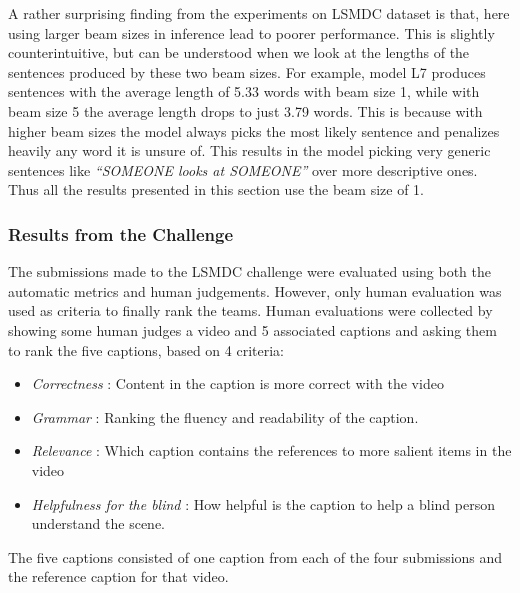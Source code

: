 A rather surprising finding from the experiments on LSMDC dataset is that, here
using larger beam sizes in inference lead to poorer performance.
This is slightly counterintuitive, but can be understood when we look at the
lengths of the sentences produced by these two beam sizes. 
For example, model L7 produces sentences with the average length
of 5.33 words with beam size 1, while with beam size 5 the average length drops
to just 3.79 words. This is because with higher beam sizes the model always
picks the most likely sentence and penalizes heavily any word it is unsure of.
This results in the model picking very generic sentences like \emph{``SOMEONE
looks at SOMEONE''} over more descriptive ones.
Thus all the results presented in this section use the beam size of 1.

\subsubsection{Results from the Challenge}
\label{subsec:LSMDCChall}
The submissions made to the LSMDC challenge were evaluated using both the
automatic metrics and human judgements.
However, only human evaluation was used as criteria to finally rank the teams.
Human evaluations were collected by showing some human judges a video and 5
associated captions and asking them to rank the five captions, based on 4
criteria:
\begin{itemize}
  \item \emph{Correctness} : Content in the caption is more correct with the video 
  \item \emph{Grammar} : Ranking the fluency and readability of the caption. 
  \item \emph{Relevance} : Which caption contains the references to more salient items in the video
  \item \emph{Helpfulness for the blind} : How helpful is the caption to help a
          blind person understand the scene.
\end{itemize}
The five captions consisted of one caption from each of the four submissions and
the reference caption for that video.

